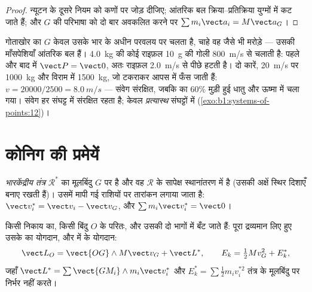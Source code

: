 \begin{proof}
न्यूटन के दूसरे नियम को कणों पर जोड़ दीजिए; आंतरिक बल क्रिया--प्रतिक्रिया
युग्मों में कट जाते हैं; और $G$ की परिभाषा को दो बार अवकलित करने पर
$\sum m_i\vect a_i = M\vect a_G$।
\end{proof}

\begin{example}[गोताखोर, प्रतिक्षेप, संघट्ट]\label{ex:b1:systems-of-points:cm}
गोताखोर का $G$ केवल उसके भार के अधीन परवलय पर चलता है, चाहे वह जैसे भी
मरोड़े --- उसकी माँसपेशियाँ आंतरिक बल हैं। \qty{4.0}{kg} की कोई राइफ़ल
\qty{10}{g} की गोली \qty{800}{m/s} से चलाती है: पहले और बाद में
$\vect P = \vect 0$, अतः राइफ़ल \qty{2.0}{m/s} से पीछे हटती है। दो कारें,
\qty{20}{m/s} पर \qty{1000}{kg} और विराम में \qty{1500}{kg}, जो टकराकर
आपस में फँस जाती हैं: $v =
20000/2500 = \qty{8.0}{m/s}$ --- संवेग संरक्षित, जबकि  का
$60\%$ मुड़ी हुई धातु और ऊष्मा में चला गया। संवेग हर संघट्ट में संरक्षित
रहता है;  केवल \emph{प्रत्यास्थ} संघट्टों में
(\cref{exo:b1:systems-of-points:12})।
\end{example}

\section{कोनिग की प्रमेयें}

\begin{definition}[भारकेंद्रीय तंत्र]\label{def:b1:systems-of-points:barycentric}
\emph{भारकेंद्रीय तंत्र} $\mathcal R^*$ का मूलबिंदु $G$ पर है और वह
 $\mathcal R$ के सापेक्ष स्थानांतरण में है (उसकी अक्षें
स्थिर दिशाएँ बनाए रखती हैं)। उसमें मापी गई राशियों पर तारांकन लगाया जाता
है: $\vect v_i^*
= \vect v_i - \vect v_G$, और $\sum m_i\vect v_i^* = \vect 0$।
\end{definition}

\begin{theorem}[कोनिग की प्रमेयें]\label{thm:b1:systems-of-points:koenig}
किसी निकाय का, किसी बिंदु $O$ के परितः,  और उसकी  दो
भागों में बँट जाते हैं: पूरा द्रव्यमान लिए हुए उसके  का
योगदान, और  में के योगदान:
\[
\vect L_O = \vect{OG}\wedge M\vect v_G + \vect L^*, \qquad
E_k = \tfrac12 Mv_G^2 + E_k^*,
\]
जहाँ $\vect L^* = \sum\vect{GM_i}\wedge m_i\vect v_i^*$ और $E_k^* = \sum\tfrac12
m_iv_i^{*2}$ तंत्र के मूलबिंदु पर निर्भर नहीं करते।
\end{theorem}

